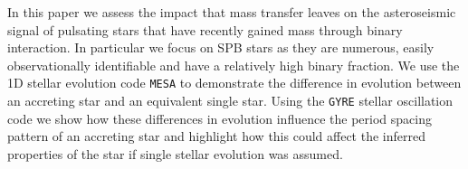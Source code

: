 \documentclass[twocolumn, twocolappendix, oneside]{aastex631}
\newcommand{\paraOutlineHdr}[1]{{\color{gray}[\textit{#1}]}}
\renewcommand{\bv}{Brunt–Väisälä\xspace}
\newcommand{\gmode}{$g$-mode\xspace}
\newcommand{\mesa}{\texttt{MESA}\xspace}
\begin{document}
In this paper we assess the impact that mass transfer leaves on the asteroseismic signal of pulsating stars that have recently gained mass through binary interaction. In particular we focus on SPB stars as they are numerous, easily observationally identifiable and have a relatively high binary fraction. We use the 1D stellar evolution code \mesa to demonstrate the difference in evolution between an accreting star and an equivalent single star. Using the \texttt{GYRE} stellar oscillation code we show how these differences in evolution influence the period spacing pattern of an accreting star and highlight how this could affect the inferred properties of the star if single stellar evolution was assumed.




\end{document}
